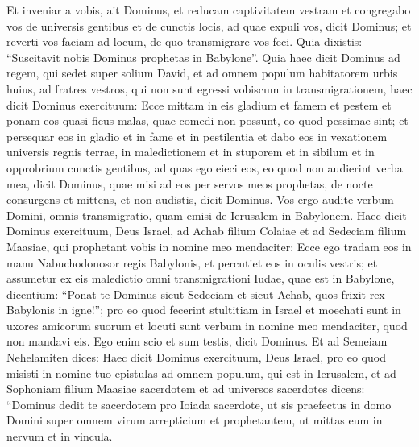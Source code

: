 \begin{biblechapter}
\begin{biblechapter}
\begin{biblechapter}
\begin{biblechapter}
\begin{biblechapter}
\begin{biblechapter}
\begin{biblechapter}
\begin{biblechapter}
\begin{biblechapter}
\begin{biblechapter}
\begin{biblechapter}
\begin{biblechapter}
\begin{biblechapter}
\begin{biblechapter}
\begin{biblechapter}
\begin{biblechapter}
\begin{biblechapter}
\begin{biblechapter}
\begin{biblechapter}
\begin{biblechapter}
\begin{biblechapter}
\begin{biblechapter}
\begin{biblechapter}
\begin{biblechapter}
\begin{biblechapter}
\begin{biblechapter}
\begin{biblechapter}
\begin{biblechapter}
\begin{biblechapter}
\verse Et inveniar a vobis, ait Dominus, et reducam captivitatem vestram et congregabo vos de universis gentibus et de cunctis locis, ad quae expuli vos, dicit Dominus; et reverti vos faciam ad locum, de quo transmigrare vos feci.
 \verse Quia dixistis: “Suscitavit nobis Dominus prophetas in Babylone”.
 \verse Quia haec dicit Dominus ad regem, qui sedet super solium David, et ad omnem populum habitatorem urbis huius, ad fratres vestros, qui non sunt egressi vobiscum in transmigrationem, 
\verse haec dicit Dominus exercituum: Ecce mittam in eis gladium et famem et pestem et ponam eos quasi ficus malas, quae comedi non possunt, eo quod pessimae sint; 
\verse et persequar eos in gladio et in fame et in pestilentia et dabo eos in vexationem universis regnis terrae, in maledictionem et in stuporem et in sibilum et in opprobrium cunctis gentibus, ad quas ego eieci eos, 
\verse eo quod non audierint verba mea, dicit Dominus, quae misi ad eos per servos meos prophetas, de nocte consurgens et mittens, et non audistis, dicit Dominus. 
\verse Vos ergo audite verbum Domini, omnis transmigratio, quam emisi de Ierusalem in Babylonem.
 \verse Haec dicit Dominus exercituum, Deus Israel, ad Achab filium Colaiae et ad Sedeciam filium Maasiae, qui prophetant vobis in nomine meo mendaciter: Ecce ego tradam eos in manu Nabuchodonosor regis Babylonis, et percutiet eos in oculis vestris; 
\verse et assumetur ex eis maledictio omni transmigrationi Iudae, quae est in Babylone, dicentium: “Ponat te Dominus sicut Sedeciam et sicut Achab, quos frixit rex Babylonis in igne!”; 
\verse pro eo quod fecerint stultitiam in Israel et moechati sunt in uxores amicorum suorum et locuti sunt verbum in nomine meo mendaciter, quod non mandavi eis. Ego enim scio et sum testis, dicit Dominus.
 \verse Et ad Semeiam Nehelamiten dices: 
\verse Haec dicit Dominus exercituum, Deus Israel, pro eo quod misisti in nomine tuo epistulas ad omnem populum, qui est in Ierusalem, et ad Sophoniam filium Maasiae sacerdotem et ad universos sacerdotes dicens: 
\verse “Dominus dedit te sacerdotem pro Ioiada sacerdote, ut sis praefectus in domo Domini super omnem virum arrepticium et prophetantem, ut mittas eum in nervum et in vincula. 

\end{biblechapter}
\end{biblechapter}
\end{biblechapter}
\end{biblechapter}
\end{biblechapter}
\end{biblechapter}
\end{biblechapter}
\end{biblechapter}
\end{biblechapter}
\end{biblechapter}
\end{biblechapter}
\end{biblechapter}
\end{biblechapter}
\end{biblechapter}
\end{biblechapter}
\end{biblechapter}
\end{biblechapter}
\end{biblechapter}
\end{biblechapter}
\end{biblechapter}
\end{biblechapter}
\end{biblechapter}
\end{biblechapter}
\end{biblechapter}
\end{biblechapter}
\end{biblechapter}
\end{biblechapter}
\end{biblechapter}
\end{biblechapter}
